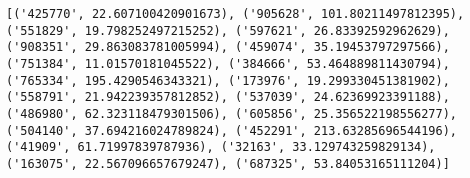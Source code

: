 \documentclass[11pt]{article}
\begin{document}
    \begin{Verbatim}[commandchars=\\\{\}]
[('425770', 22.607100420901673), ('905628', 101.80211497812395), ('551829', 19.798252497215252), ('597621', 26.83392592962629), ('908351', 29.863083781005994), ('459074', 35.19453797297566), ('751384', 11.01570181045522), ('384666', 53.464889811430794), ('765334', 195.4290546343321), ('173976', 19.299330451381902), ('558791', 21.942239357812852), ('537039', 24.62369923391188), ('486980', 62.323118479301506), ('605856', 25.356522198556277), ('504140', 37.694216024789824), ('452291', 213.63285696544196), ('41909', 61.71997839787936), ('32163', 33.129743259829134), ('163075', 22.567096657679247), ('687325', 53.84053165111204)]

    \end{Verbatim}


    
    
    
    
\end{document}
